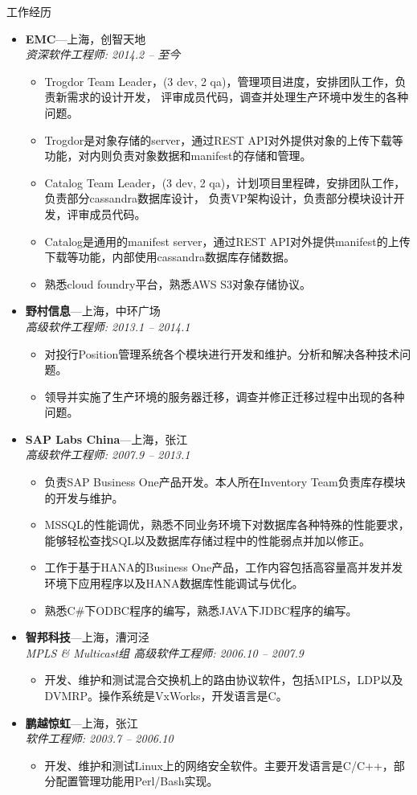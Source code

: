 \documentclass[11pt,oneside]{article}
\newenvironment{ressection}[1]{
	\vspace{4pt}
	{\selectfont\Large#1}
	\begin{itemize}
	\vspace{3pt}
}{
	\end{itemize}
}
\newcommand{\ressubitem}[1]{
	\vspace{-1pt}
	\item \begin{flushleft} #1 \end{flushleft}
}
\newcommand{\resbigitem}[3]{
	\vspace{-5pt}
	\item
	\textbf{#1}---#2 \\
	\textit{#3}
}
\newenvironment{ressubsec}[3]{
	\resbigitem{#1}{#2}{#3}
	\vspace{-2pt}
	\begin{itemize}
}{
    \end{itemize}
}
\begin{document}
\begin{ressection}{工作经历}

	\begin{ressubsec}{EMC}{上海，创智天地}{资深软件工程师: 2014.2 -- 至今}
		\ressubitem{Trogdor Team Leader，(3 dev, 2 qa)，管理项目进度，安排团队工作，负责新需求的设计开发，
					评审成员代码，调查并处理生产环境中发生的各种问题。}
		\ressubitem{Trogdor是对象存储的server，通过REST API对外提供对象的上传下载等功能，对内则负责对象数据和manifest的存储和管理。}
		\ressubitem{Catalog Team Leader，(3 dev, 2 qa)，计划项目里程碑，安排团队工作，负责部分cassandra数据库设计，
					负责VP架构设计，负责部分模块设计开发，评审成员代码。}
		\ressubitem{Catalog是通用的manifest server，通过REST API对外提供manifest的上传下载等功能，内部使用cassandra数据库存储数据。}
		\ressubitem{熟悉cloud foundry平台，熟悉AWS S3对象存储协议。}
	\end{ressubsec}

	\begin{ressubsec}{野村信息}{上海，中环广场}{高级软件工程师: 2013.1 -- 2014.1}
		\ressubitem{对投行Position管理系统各个模块进行开发和维护。分析和解决各种技术问题。}
		\ressubitem{领导并实施了生产环境的服务器迁移，调查并修正迁移过程中出现的各种问题。}
	\end{ressubsec}

	\begin{ressubsec}{SAP Labs China}{上海，张江}{高级软件工程师: 2007.9 -- 2013.1}
		\ressubitem{负责SAP Business One产品开发。本人所在Inventory Team负责库存模块的开发与维护。}
		\ressubitem{MSSQL的性能调优，熟悉不同业务环境下对数据库各种特殊的性能要求，
					能够轻松查找SQL以及数据库存储过程中的性能弱点并加以修正。}
		\ressubitem{工作于基于HANA的Business One产品，工作内容包括高容量高并发并发环境下应用程序以及HANA数据库性能调试与优化。}
		\ressubitem{熟悉C\#下ODBC程序的编写，熟悉JAVA下JDBC程序的编写。}
	\end{ressubsec}

	\begin{ressubsec}{智邦科技}{上海，漕河泾}{MPLS \& Multicast组 高级软件工程师: 2006.10 -- 2007.9}
		\ressubitem{开发、维护和测试混合交换机上的路由协议软件，包括MPLS，LDP以及DVMRP。操作系统是VxWorks，开发语言是C。}
	\end{ressubsec}

	\begin{ressubsec}{鹏越惊虹}{上海，张江}{软件工程师: 2003.7 -- 2006.10}
		\ressubitem{开发、维护和测试Linux上的网络安全软件。主要开发语言是C/C++，部分配置管理功能用Perl/Bash实现。}
	\end{ressubsec}

\end{ressection}
\end{document}
